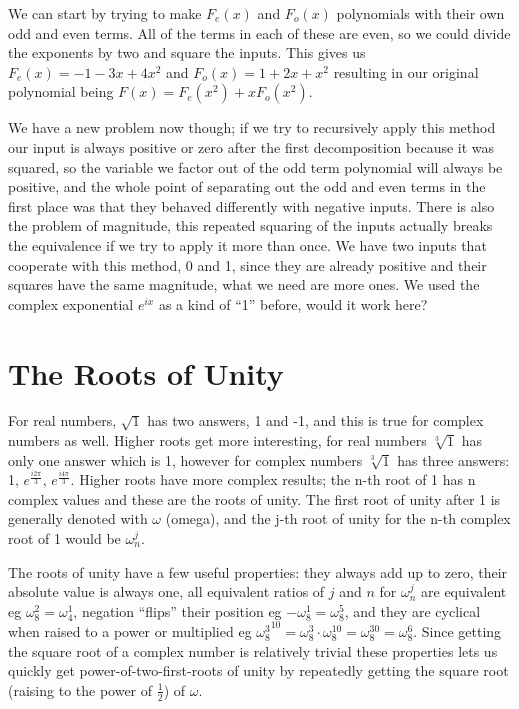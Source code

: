 \documentclass[12pt]{article}
\begin{document}
We can start by trying to make $F_e(x)$ and $F_o(x)$ polynomials with their own odd and even terms. All of the terms in each of these are even, so we could divide the exponents by two and square the inputs. This gives us $F_e(x)=-1-3x+4x^2$ and $F_o(x)=1+2x+x^2$ resulting in our original polynomial being $F(x) = F_e(x^2) + x F_o(x^2)$.

We have a new problem now though; if we try to recursively apply this method our input is always positive or zero after the first decomposition because it was squared, so the variable we factor out of the odd term polynomial will always be positive, and the whole point of separating out the odd and even terms in the first place was that they behaved differently with negative inputs. There is also the problem of magnitude, this repeated squaring of the inputs actually breaks the equivalence if we try to apply it more than once. We have two inputs that cooperate with this method, 0 and 1, since they are already positive and their squares have the same magnitude, what we need are more ones. We used the complex exponential $e^{ix}$ as a kind of ``1'' before, would it work here?
\pagebreak

\section{The Roots of Unity}

\rootsOfUnity

For real numbers, $\sqrt{1}$ has two answers, 1 and -1, and this is true for complex numbers as well. Higher roots get more interesting, for real numbers $\sqrt[3]{1}$ has only one answer which is 1, however for complex numbers $\sqrt[3]{1}$ has three answers: 1, $e^\frac{i2\pi}{3}$, $e^\frac{i4\pi}{3}$. Higher roots have more complex results; the n-th root of 1 has n complex values and these are the roots of unity. The first root of unity after 1 is generally denoted with $\omega$ (omega), and the j-th root of unity for the n-th complex root of 1 would be $\omega_n^j$.

The roots of unity have a few useful properties: they always add up to zero, their absolute value is always one, all equivalent ratios of $j$ and $n$ for $\omega_n^j$ are equivalent eg $\omega_8^2 = \omega_4^1$, negation ``flips'' their position eg $-\omega_8^1 = \omega_8^5$, and they are cyclical when raised to a power or multiplied eg ${\omega_8^3}^{10} = \omega_8^3 \cdot \omega_8^{10} = \omega_8^{30} = \omega_8^6$. Since getting the square root of a complex number is relatively trivial these properties lets us quickly get power-of-two-first-roots of unity by repeatedly getting the square root (raising to the power of $\frac{1}{2}$) of $\omega$.
\end{document}
